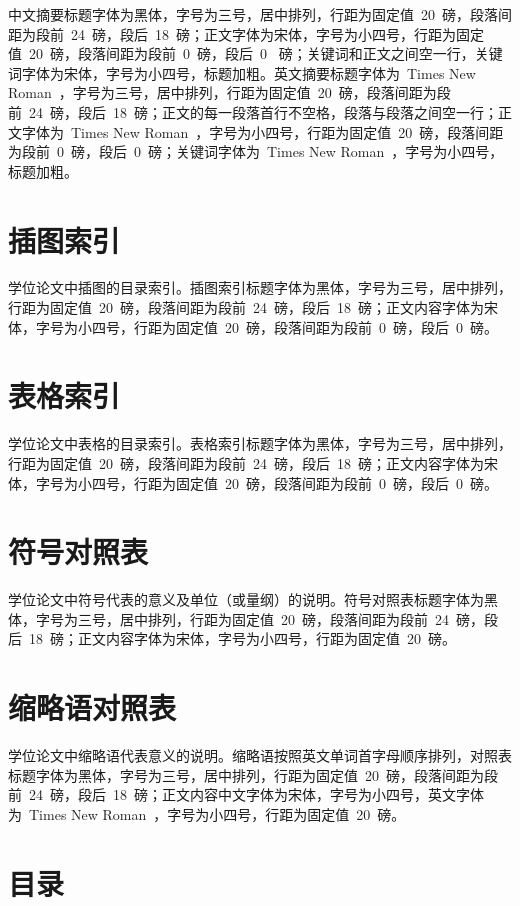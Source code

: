 中文摘要标题字体为黑体，字号为三号，居中排列，行距为固定值~20~磅，段落间距为段前~24~磅，段后~18~磅；正文字体为宋体，字号为小四号，行距为固定值~20~磅，段落间距为段前~0~磅，段后~0~ 磅；关键词和正文之间空一行，关键词字体为宋体，字号为小四号，标题加粗。英文摘要标题字体为~Times New Roman~，字号为三号，居中排列，行距为固定值~20~磅，段落间距为段前~24~磅，段后~18~磅；正文的每一段落首行不空格，段落与段落之间空一行；正文字体为~Times New Roman~，字号为小四号，行距为固定值~20~磅，段落间距为段前~0~磅，段后~0~磅；关键词字体为~Times New Roman~，字号为小四号，标题加粗。

\section{插图索引}

学位论文中插图的目录索引。插图索引标题字体为黑体，字号为三号，居中排列，行距为固定值~20~磅，段落间距为段前~24~磅，段后~18~磅；正文内容字体为宋体，字号为小四号，行距为固定值~20~磅，段落间距为段前~0~磅，段后~0~磅。

\section{表格索引}

学位论文中表格的目录索引。表格索引标题字体为黑体，字号为三号，居中排列，行距为固定值~20~磅，段落间距为段前~24~磅，段后~18~磅；正文内容字体为宋体，字号为小四号，行距为固定值~20~磅，段落间距为段前~0~磅，段后~0~磅。

\section{符号对照表}

学位论文中符号代表的意义及单位（或量纲）的说明。符号对照表标题字体为黑体，字号为三号，居中排列，行距为固定值~20~磅，段落间距为段前~24~磅，段后~18~磅；正文内容字体为宋体，字号为小四号，行距为固定值~20~磅。

\section{缩略语对照表}

学位论文中缩略语代表意义的说明。缩略语按照英文单词首字母顺序排列，对照表标题字体为黑体，字号为三号，居中排列，行距为固定值~20~磅，段落间距为段前~24~磅，段后~18~磅；正文内容中文字体为宋体，字号为小四号，英文字体为~Times New Roman~，字号为小四号，行距为固定值~20~磅。

\section{目录}

